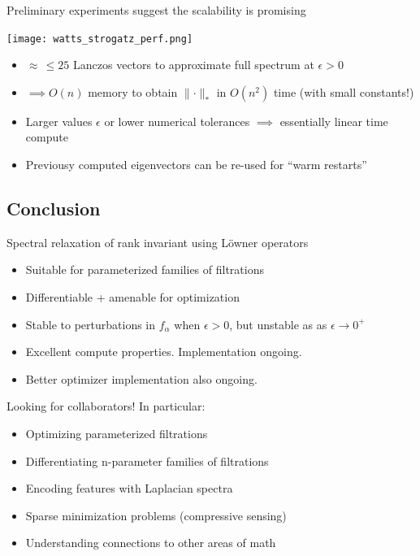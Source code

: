 \documentclass[
  letterpaper,
  DIV=11,
  numbers=noendperiod,
  oneside]{scrartcl}
\providecommand{\tightlist}{%
  \setlength{\itemsep}{0pt}\setlength{\parskip}{0pt}}\usepackage{longtable,booktabs,array}
\begin{document}
Preliminary experiments suggest the scalability is promising

\texttt{[image: watts\_strogatz\_perf.png]}

\begin{itemize}
\tightlist
\item
  \(\approx \, \leq 25\) Lanczos vectors to approximate full spectrum at
  \(\epsilon > 0\)
\item
  \(\implies O(n)\) memory to obtain \(\lVert \cdot \rVert_\ast\) in
  \(O(n^2)\) time (with small constants!)
\item
  Larger values \(\epsilon\) or lower numerical tolerances \(\implies\)
  essentially linear time compute
\item
  Previousy computed eigenvectors can be re-used for ``warm restarts''
\end{itemize}

\hypertarget{conclusion}{%
\subsection{Conclusion}\label{conclusion}}

Spectral relaxation of rank invariant using Löwner operators

\begin{itemize}
\tightlist
\item
  Suitable for parameterized families of filtrations
\item
  Differentiable + amenable for optimization
\item
  Stable to perturbations in \(f_\alpha\) when \(\epsilon > 0\), but
  unstable as as \(\epsilon \to 0^+\)
\item
  Excellent compute properties. Implementation ongoing.
\item
  Better optimizer implementation also ongoing.
\end{itemize}

Looking for collaborators! In particular:

\begin{itemize}
\tightlist
\item
  Optimizing parameterized filtrations
\item
  Differentiating n-parameter families of filtrations
\item
  Encoding features with Laplacian spectra
\item
  Sparse minimization problems (compressive sensing)
\item
  Understanding connections to other areas of math
\end{itemize}
\end{document}
